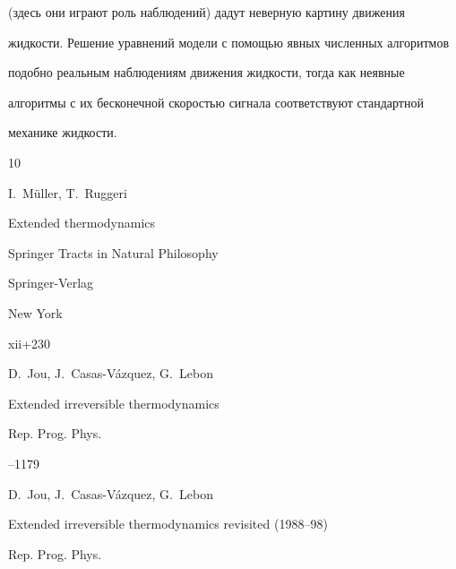 (здесь они играют роль наблюдений) дадут неверную картину движения

жидкости. Решение уравнений модели с помощью явных численных алгоритмов

подобно реальным наблюдениям движения жидкости, тогда как неявные

алгоритмы с их бесконечной скоростью сигнала соответствуют стандартной

механике жидкости.










\clear



\begin{thebibliography}{10}




\by I.~M\"uller, T.~Ruggeri

\book  Extended thermodynamics  

\serial Springer Tracts in Natural Philosophy


\publ Springer-Verlag 

\publaddr New York


\totalpages xii+230






\by D.~Jou, J.~Casas-V\'azquez, G.~Lebon

\paper Extended irreversible thermodynamics 

\jour  Rep. Prog. Phys. 



--1179 









\by D.~Jou, J.~Casas-V\'azquez, G.~Lebon

\paper  Extended irreversible thermodynamics revisited (1988--98) 

\jour  Rep. Prog. Phys. 



\end{thebibliography}
